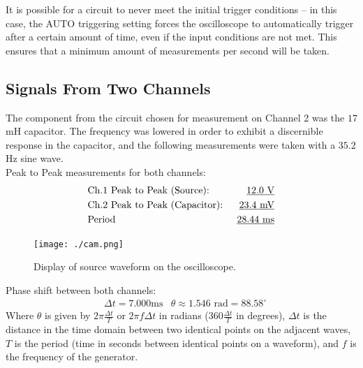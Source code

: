 \documentclass[twocolumn,english]{IEEEtran}
\theoremstyle{plain}
\theoremstyle{plain}
\begin{document}
It is possible for a circuit to never meet the initial trigger conditions -- in this case, the AUTO triggering setting forces the oscilloscope to automatically trigger after a certain amount of time, even if the input conditions are not met. This ensures that a minimum amount of measurements per second will be taken.

\subsection{Signals From Two Channels}
The component from the circuit chosen for measurement on Channel 2 was the $17$ mH capacitor. The frequency was lowered in order to exhibit a discernible response in the capacitor, and the following measurements were taken with a $35.2$ Hz sine wave. \\


\noindent Peak to Peak measurements for both channels:
\begin{align*}
 &\text{Ch.1 Peak to Peak (Source): }		&\text{\underline{$12.0$ V}}	\\
 &\text{Ch.2 Peak to Peak (Capacitor): }	&\text{\underline{$23.4$ mV}}	\\
 &\text{Period}		&\text{\underline{28.44 ms}}
\end{align*}

\begin{figure}[h!]
  \begin{centering}
  \begin{center}
  \texttt{[image: ./cam.png]}
  \label{fig:source_voltage}
  \caption{Display of source waveform on the oscilloscope.}
  \end{center}
  \par\end{centering}
  \end{figure}

\noindent Phase shift between both channels:
\begin{align*}
 &\Delta t = 7.000\text{ms}	&\theta \approx 1.546\text{ rad} = 88.58^{\circ}
\end{align*}
Where $\theta$ is given by  $2\pi\frac{\Delta t}{T}$ or $2\pi f \Delta t$ in radians ($360\frac{\Delta t}{T}$ in degrees), $\Delta t$ is the distance in the time domain between two identical points on the adjacent waves, $T$ is the period (time in seconds between identical points on a waveform), and $f$ is the frequency of the generator.
\end{document}
